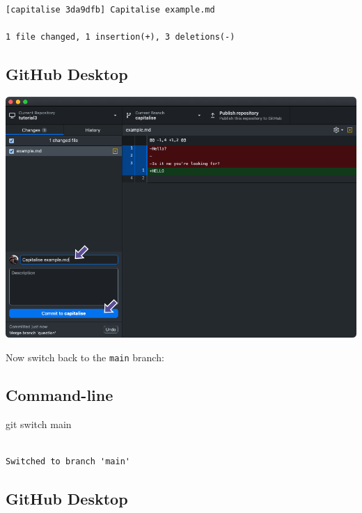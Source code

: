 \documentclass[
  letterpaper,
  DIV=11,
  numbers=noendperiod]{scrartcl}
\newenvironment{Shaded}{\begin{snugshade}}{\end{snugshade}}
\newcommand{\FunctionTok}[1]{\textcolor[rgb]{0.28,0.35,0.67}{#1}}
\newcommand{\NormalTok}[1]{\textcolor[rgb]{0.00,0.23,0.31}{#1}}
\begin{document}
\begin{verbatim}
[capitalise 3da9dfb] Capitalise example.md

1 file changed, 1 insertion(+), 3 deletions(-)
\end{verbatim}

\subsection{GitHub Desktop}

\includegraphics{images/image47.png}

Now switch back to the \texttt{main} branch:

\subsection{Command-line}

\begin{Shaded}
\begin{Highlighting}[]
\FunctionTok{git}\NormalTok{ switch main}
\end{Highlighting}
\end{Shaded}

\begin{verbatim}

Switched to branch 'main'
\end{verbatim}

\subsection{GitHub Desktop}
\end{document}
